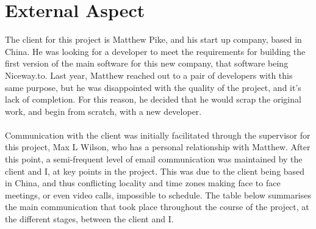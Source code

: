 \section{External Aspect}

The client for this project is Matthew Pike, and his start up company, based in China. He was looking for a developer to meet the requirements for building the first version of the main software for this new company, that software being Niceway.to. Last year, Matthew reached out to a pair of developers with this same purpose, but he was disappointed with the quality of the project, and it's lack of completion. For this reason, he decided that he would scrap the original work, and begin from scratch, with a new developer.\ \\
\ \\
Communication with the client was initially facilitated through the supervisor for this project, Max L Wilson, who has a personal relationship with Matthew. After this point, a semi-frequent level of email communication was maintained by the client and I, at key points in the project. This was due to the client being based in China, and thus conflicting locality and time zones making face to face meetings, or even video calls, impossible to schedule. The table below summarises the main communication that took place throughout the course of the project, at the different stages, between the client and I.

